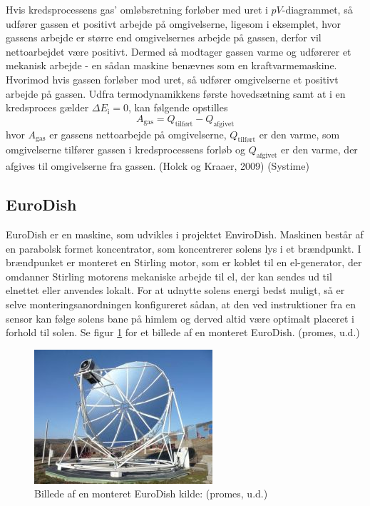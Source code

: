 \documentclass[SRC.tex]{subfiles}
\begin{document}
	Hvis kredsprocessens gas' omløbsretning forløber med uret i \(pV\)-diagrammet, 
	så udfører gassen et positivt arbejde på omgivelserne, ligesom i eksemplet, 
	hvor gassens arbejde er større end omgivelsernes arbejde på gassen, derfor vil 
	nettoarbejdet være positivt. Dermed så modtager gassen varme og 
	udførerer et mekanisk arbejde - en sådan maskine benævnes som en kraftvarmemaskine. Hvorimod hvis gassen forløber mod uret, så udfører 
	omgivelserne et positivt arbejde på gassen. Udfra termodynamikkens første 
	hovedsætning samt at i en kredsproces gælder \(\Delta E_\text{i} = 0\), kan 
	følgende opstilles
	\begin{equation}
	A_{\text{gas}} = Q_{\text{tilført}} - Q_{\text{afgivet}}
	\end{equation} 
	hvor \(A_{\text{gas}}\) er gassens nettoarbejde på omgivelserne, 
	\(Q_{\text{tilført}}\) er den varme, som omgivelserne tilfører gassen i 
	kredsprocessens forløb og \(Q_{\text{afgivet}}\) er den varme, der afgives 
	til omgivelserne fra gassen. (Holck og Kraaer, 2009) (Systime) 
	
	\subsection{EuroDish}
	EuroDish er en maskine, som udvikles i projektet EnviroDish. Maskinen består
	af en parabolsk formet koncentrator, som koncentrerer solens lys i et brændpunkt. 
	I brændpunket er monteret en Stirling motor, som er koblet til en el-generator,
	der omdanner Stirling motorens mekaniske arbejde til el, der kan sendes ud til 
	elnettet eller anvendes lokalt. For at udnytte solens energi bedst muligt, så er
	selve monteringsanordningen konfigureret sådan, at den ved instruktioner fra en 
	sensor kan følge solens bane på himlem og derved altid være optimalt placeret i forhold til solen. Se figur \ref{fig:744-9} for et billede af en 
	monteret EuroDish. (promes, u.d.) 
	\begin{figure}[h]
		\centering
		\includegraphics[scale=0.6]{Billeder/744-9}
		\caption{Billede af en monteret EuroDish kilde: (promes, u.d.) }
		\label{fig:744-9}
	\end{figure}
\end{document}
